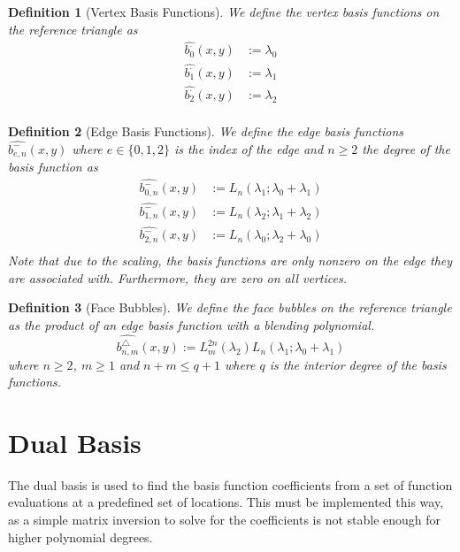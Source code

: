 \documentclass[10pt,a4paper]{article}
\newtheorem{defn}{Definition}
\begin{document}
    \begin{defn}[Vertex Basis Functions]
        We define the vertex basis functions on the reference triangle as
        \begin{align*}
            \widehat{b_0^{\cdot}}(x,y) &:= \lambda_0 \\
            \widehat{b_1^{\cdot}}(x,y) &:= \lambda_1 \\
            \widehat{b_2^{\cdot}}(x,y) &:= \lambda_2 \\
        \end{align*}
    \end{defn}

    \begin{defn}[Edge Basis Functions]
        We define the edge basis functions $\widehat{b_{e,n}^{-}}(x,y)$ where $e \in \{0,1,2\}$ is the index of the edge and $n \geq 2$ the degree of the basis function as
        \begin{align*}
            \widehat{b_{0,n}^{-}}(x,y) &:= L_n(\lambda_1 ; \lambda_0+\lambda_1) \\
            \widehat{b_{1,n}^{-}}(x,y) &:= L_n(\lambda_2 ; \lambda_1+\lambda_2) \\
            \widehat{b_{2,n}^{-}}(x,y) &:= L_n(\lambda_0 ; \lambda_2+\lambda_0) \\
        \end{align*}
        Note that due to the scaling, the basis functions are only nonzero on the edge they are associated with. Furthermore, they are zero on all vertices.
    \end{defn}

    \begin{defn}[Face Bubbles]
        We define the face bubbles on the reference triangle as the product of an edge basis function with a blending polynomial.
        \begin{equation*}
            \widehat{b_{n,m}^{\triangle}}(x,y) := L_m^{2n}(\lambda_2)L_n(\lambda_1 ; \lambda_0+\lambda_1)
        \end{equation*}
        where $n \geq 2$, $m \geq 1$ and $n+m \leq q+1$ where $q$ is the interior degree of the basis functions.
    \end{defn}


\section{Dual Basis}

    The dual basis is used to find the basis function coefficients from a set of function evaluations at a predefined set of locations. This must be implemented this way, as a simple matrix inversion to solve for the coefficients is not stable enough for higher polynomial degrees.
    
\end{document}
